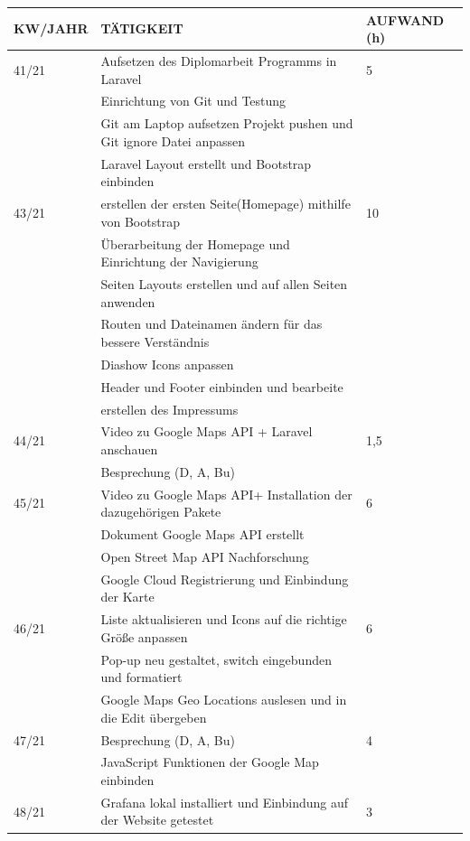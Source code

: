 \newpage
\begin{table}[h]
		\begin{tabular}{|l|l|l|}
		\hline
		\textbf{KW/JAHR} &     \textbf{TÄTIGKEIT}  & 	\textbf{AUFWAND (h)}    \\ \hline
		
	41/21 	& Aufsetzen des Diplomarbeit Programms in Laravel & 5 \\
			& Einrichtung von Git und Testung & \\
			& Git am Laptop aufsetzen Projekt pushen und Git ignore Datei anpassen & \\
			&  Laravel Layout erstellt und Bootstrap einbinden & \\ \hline
	43/21  	& erstellen der ersten Seite(Homepage) mithilfe von Bootstrap & 10\\
			& Überarbeitung der Homepage und Einrichtung der Navigierung  &\\
			& Seiten Layouts erstellen und auf allen Seiten anwenden &\\
			& Routen und Dateinamen ändern für das bessere Verständnis &\\
			& Diashow Icons anpassen &\\
			& Header  und Footer  einbinden und bearbeite &\\
			&erstellen des Impressums &\\ \hline
	44/21  	& Video zu Google Maps API + Laravel anschauen & 1,5 \\
			& Besprechung (D, A, Bu) & \\ \hline
	45/21   &Video zu Google Maps API+ Installation der dazugehörigen Pakete & 6\\
			&Dokument Google Maps API erstellt& \\
			&Open Street Map API Nachforschung&\\
			&Google Cloud Registrierung und Einbindung der Karte&\\ \hline
	46/21   &Liste aktualisieren und Icons auf die richtige Größe anpassen & 6\\
			&Pop-up neu gestaltet, switch eingebunden und formatiert &\\
			&Google Maps Geo Locations auslesen und in die Edit übergeben&\\ \hline
	47/21   & Besprechung (D, A, Bu)& 4\\
			&JavaScript Funktionen der Google Map einbinden&\\ \hline
	48/21	&Grafana lokal installiert und Einbindung auf der Website getestet& 3\\ \hline

\end{tabular}
\end{table}
